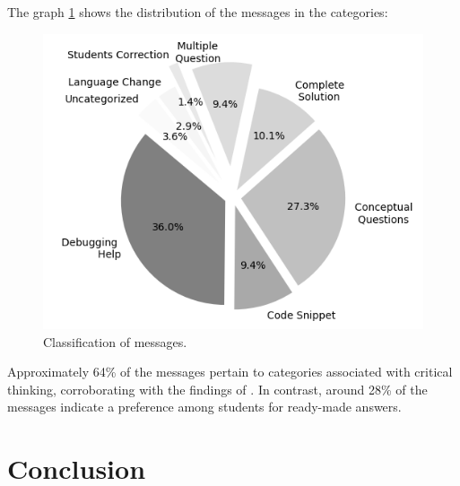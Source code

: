 \documentclass[conference]{IEEEtran}
\begin{document}
The graph \ref{fig:graph1} shows the distribution of the messages in the
categories:
\begin{figure}[h!]
    \centering
    \includegraphics[scale=0.7]{figures/figure1.png}
    \caption{Classification of messages.}
    \label{fig:graph1}
\end{figure}

Approximately 64\% of the messages pertain to categories associated with
critical thinking, corroborating with the findings of
\cite{10.1007/978-3-031-64299-9_20}. In contrast, around 28\% of the messages
indicate a preference among students for ready-made answers.

\section{Conclusion}



\end{document}
